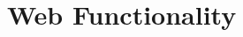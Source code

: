 \documentclass[
	english,
	ruledheaders=section,%
	class=report,%
	thesis={type=Report},%
	accentcolor=9c,%
	custommargins=true,%
	marginpar=false,%
	parskip=half-,%
	fontsize=11pt,%
	logofile={img/tuda_logo.pdf}, %
]{tudapub}
\begin{document}

\section{Web Functionality}
\end{document}
